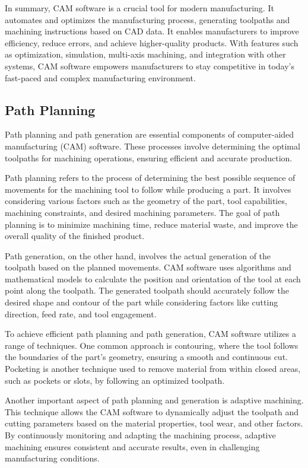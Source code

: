 In summary, CAM software is a crucial tool for modern manufacturing. It automates and optimizes the manufacturing process, generating toolpaths and machining instructions based on CAD data. It enables manufacturers to improve efficiency, reduce errors, and achieve higher-quality products. With features such as optimization, simulation, multi-axis machining, and integration with other systems, CAM software empowers manufacturers to stay competitive in today's fast-paced and complex manufacturing environment.
\subsection{Path Planning}
Path planning and path generation are essential components of computer-aided manufacturing (CAM) software. These processes involve determining the optimal toolpaths for machining operations, ensuring efficient and accurate production.

Path planning refers to the process of determining the best possible sequence of movements for the machining tool to follow while producing a part. It involves considering various factors such as the geometry of the part, tool capabilities, machining constraints, and desired machining parameters. The goal of path planning is to minimize machining time, reduce material waste, and improve the overall quality of the finished product.

Path generation, on the other hand, involves the actual generation of the toolpath based on the planned movements. CAM software uses algorithms and mathematical models to calculate the position and orientation of the tool at each point along the toolpath. The generated toolpath should accurately follow the desired shape and contour of the part while considering factors like cutting direction, feed rate, and tool engagement.

To achieve efficient path planning and path generation, CAM software utilizes a range of techniques. One common approach is contouring, where the tool follows the boundaries of the part's geometry, ensuring a smooth and continuous cut. Pocketing is another technique used to remove material from within closed areas, such as pockets or slots, by following an optimized toolpath.

Another important aspect of path planning and generation is adaptive machining. This technique allows the CAM software to dynamically adjust the toolpath and cutting parameters based on the material properties, tool wear, and other factors. By continuously monitoring and adapting the machining process, adaptive machining ensures consistent and accurate results, even in challenging manufacturing conditions.

